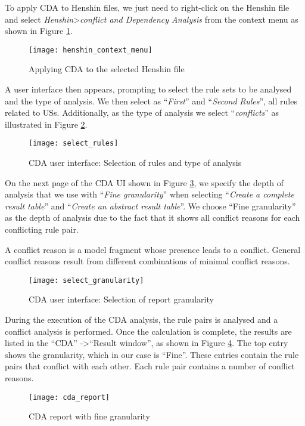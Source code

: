 To apply CDA to Henshin files, we just need to right-click on the Henshin file and select \textit{Henshin}\textgreater\textit{conflict and Dependency Analysis} from the context menu as shown in Figure \ref{fig:henshin_context_menu}.
\begin{figure}[h]
	\centering
	\texttt{[image: henshin\_context\_menu]}
	\caption{Applying CDA to the selected Henshin file}\label{fig:henshin_context_menu}
\end{figure}
A user interface then appears, prompting to select the rule sets to be analysed and the type of analysis. We then select as \enquote{\textit{First}} and \enquote{\textit{Second} \textit{Rules}}, all rules related to USs. Additionally, as the type of analysis we select \enquote{\textit{conflicts}} as illustrated in Figure \ref{fig:select_rules}.

\begin{figure}[h]
	\centering
	\texttt{[image: select\_rules]}
	\caption{CDA user interface: Selection of rules and type of analysis}\label{fig:select_rules}
\end{figure}

 On the next page of the CDA UI shown in Figure \ref{fig:select_granularity}, we specify the depth of analysis that we use with \enquote{\textit{Fine granularity}} when selecting \enquote{\textit{Create a complete result table}} and \enquote{\textit{Create an abstract result table}}. We choose \enquote{Fine granularity} as the depth of analysis due to the fact that it shows all conflict reasons for each conflicting rule pair.
 
 A conflict reason is a model fragment whose presence leads to a conflict. General conflict reasons result from different combinations of minimal conflict reasons\cite{cda_api}.
 \begin{figure}[h]
 	\centering
 	\texttt{[image: select\_granularity]}
 	\caption{CDA user interface: Selection of report granularity}\label{fig:select_granularity}
 \end{figure}
 
 During the execution of the CDA analysis, the rule pairs is analysed and a conflict analysis is performed. Once the calculation is complete, the results are listed in the \enquote{CDA} -\textgreater \enquote{Result window}, as shown in Figure \ref{fig:cda_report}. The top entry shows the granularity, which in our case is \enquote{Fine}. These entries contain the rule pairs that conflict with each other. Each rule pair contains a number of conflict reasons.
  \begin{figure}[h]
 	\centering
 	\texttt{[image: cda\_report]}
 	\caption{CDA report with fine granularity}\label{fig:cda_report}
 \end{figure}
 
